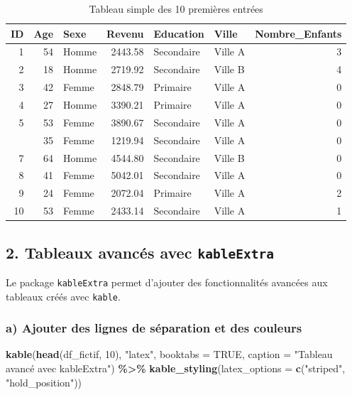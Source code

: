 \documentclass[
]{article}
\newenvironment{Shaded}{\begin{snugshade}}{\end{snugshade}}
\newcommand{\AttributeTok}[1]{\textcolor[rgb]{0.13,0.29,0.53}{#1}}
\newcommand{\ConstantTok}[1]{\textcolor[rgb]{0.56,0.35,0.01}{#1}}
\newcommand{\DecValTok}[1]{\textcolor[rgb]{0.00,0.00,0.81}{#1}}
\newcommand{\FunctionTok}[1]{\textcolor[rgb]{0.13,0.29,0.53}{\textbf{#1}}}
\newcommand{\NormalTok}[1]{#1}
\newcommand{\SpecialCharTok}[1]{\textcolor[rgb]{0.81,0.36,0.00}{\textbf{#1}}}
\newcommand{\StringTok}[1]{\textcolor[rgb]{0.31,0.60,0.02}{#1}}
\begin{document}
\begin{longtable}[t]{rrlrllr}
\caption{\label{tab:tableau-simple}Tableau simple des 10 premières entrées}\\
\toprule
ID & Age & Sexe & Revenu & Education & Ville & Nombre\_Enfants\\
\midrule
1 & 54 & Homme & 2443.58 & Secondaire & Ville A & 3\\
2 & 18 & Homme & 2719.92 & Secondaire & Ville B & 4\\
3 & 42 & Femme & 2848.79 & Primaire & Ville A & 0\\
4 & 27 & Homme & 3390.21 & Primaire & Ville A & 0\\
5 & 53 & Femme & 3890.67 & Secondaire & Ville A & 0\\
\addlinespace
6 & 35 & Femme & 1219.94 & Secondaire & Ville A & 0\\
7 & 64 & Homme & 4544.80 & Secondaire & Ville B & 0\\
8 & 41 & Femme & 5042.01 & Secondaire & Ville A & 0\\
9 & 24 & Femme & 2072.04 & Primaire & Ville A & 2\\
10 & 53 & Femme & 2433.14 & Secondaire & Ville A & 1\\
\bottomrule
\end{longtable}

\hypertarget{tableaux-avancuxe9s-avec-kableextra}{%
\subsection{\texorpdfstring{2. Tableaux avancés avec
\texttt{kableExtra}}{2. Tableaux avancés avec kableExtra}}\label{tableaux-avancuxe9s-avec-kableextra}}

Le package \texttt{kableExtra} permet d'ajouter des fonctionnalités
avancées aux tableaux créés avec \texttt{kable}.

\hypertarget{a-ajouter-des-lignes-de-suxe9paration-et-des-couleurs}{%
\subsubsection{a) Ajouter des lignes de séparation et des
couleurs}\label{a-ajouter-des-lignes-de-suxe9paration-et-des-couleurs}}

\begin{Shaded}
\begin{Highlighting}[]
\FunctionTok{kable}\NormalTok{(}\FunctionTok{head}\NormalTok{(df\_fictif, }\DecValTok{10}\NormalTok{), }\StringTok{"latex"}\NormalTok{, }\AttributeTok{booktabs =} \ConstantTok{TRUE}\NormalTok{, }\AttributeTok{caption =} \StringTok{"Tableau avancé avec kableExtra"}\NormalTok{) }\SpecialCharTok{\%\textgreater{}\%}
  \FunctionTok{kable\_styling}\NormalTok{(}\AttributeTok{latex\_options =} \FunctionTok{c}\NormalTok{(}\StringTok{"striped"}\NormalTok{, }\StringTok{"hold\_position"}\NormalTok{))}
\end{Highlighting}
\end{Shaded}
\end{document}
